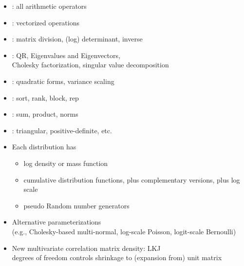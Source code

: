 \documentclass[10pt]{report}
\newcommand{\sld}[1]{\newpage{\noindent\LARGE \ \ \
    \textcolor{MidnightBlue}{\bfseries #1}}\vspace*{4pt}}
\newcommand{\myemph}[1]{{\color{MidnightBlue}{\bfseries #1}}}
\begin{document}
\sld{Built-in Matrix Functions}

\begin{itemize}
\item \myemph{Basic arithmetic}: all arithmetic operators
\item \myemph{Elementwise arithmetic}: vectorized operations
\item \myemph{Solvers}: matrix division, (log) determinant,
inverse 
\item \myemph{Decompositions}: QR, Eigenvalues and Eigenvectors, 
\\
Cholesky factorization, singular value decomposition
\item \myemph{Compound Operations}: quadratic forms, variance scaling
\item \myemph{Ordering, Slicing, Broadcasting}: sort, rank, block, rep
\item \myemph{Reductions}: sum, product, norms
\item \myemph{Specializations}: triangular, positive-definite, etc.
\end{itemize}

\sld{Distribution Library}

\begin{itemize}
\item Each distribution has
\vspace*{-4pt}
\begin{itemize}\small
\item log density or mass function
\item cumulative distribution functions, plus complementary versions,
  plus log scale
\item pseudo Random number generators
\end{itemize}
\item Alternative parameterizations
\\
{\footnotesize (e.g., Cholesky-based multi-normal,
log-scale Poisson, logit-scale Bernoulli)}
\item New multivariate correlation matrix density: LKJ
\\
{\footnotesize degrees of freedom controls 
shrinkage to (expansion from) unit matrix}
\end{itemize}

\sld{Statements}
\end{document}
